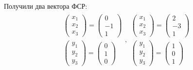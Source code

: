 \documentclass[12pt]{article}
\begin{document}
\begin{enumerate}
        Получили два вектора ФСР:
        \begin{gather*}
            \begin{array}{c}
                \begin{pmatrix}
                    x_1 \\ x_2 \\ x_3
                \end{pmatrix}
                = \begin{pmatrix}
                      0 \\ -1 \\ 1
                \end{pmatrix}             \\
                \begin{pmatrix}
                    y_1 \\ y_2 \\ y_3
                \end{pmatrix}
                = \begin{pmatrix}
                      0 \\ 1 \\ 0
                \end{pmatrix}
            \end{array},
            \begin{array}{c}
                \begin{pmatrix}
                    x_1 \\ x_2 \\ x_3
                \end{pmatrix}
                = \begin{pmatrix}
                      2 \\ -3 \\ 1
                \end{pmatrix}             \\
                \begin{pmatrix}
                    y_1 \\ y_2 \\ y_3
                \end{pmatrix}
                = \begin{pmatrix}
                      1 \\ 0 \\ 1
                \end{pmatrix}
            \end{array}

\end{gather*}
\end{enumerate}
\end{document}
